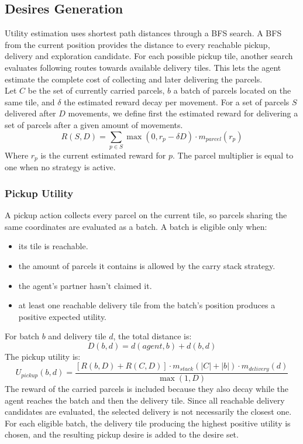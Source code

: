 \documentclass[11pt,a4paper]{article}
\begin{document}
\subsection{Desires Generation}
Utility estimation uses shortest path distances through a BFS search. 
A BFS from the current position provides the distance to every reachable pickup, delivery and exploration candidate.
For each possible pickup tile, another search evaluates following routes towards available delivery tiles. 
This lets the agent estimate the complete cost of collecting and later delivering the parcels.
\\Let $C$ be the set of currently carried parcels, $b$ a batch of parcels located on the same tile, and
$\delta$ the estimated reward decay per movement. For a set of parcels $S$ delivered after $D$ movements,
we define first the estimated reward for delivering a set of parcels after a given amount of movements.
\begin{equation*}
    R(S,D) = \sum_{p \in S} \max(0, r_p - \delta D) \cdot m_{parcel}(r_p)
\end{equation*}
Where $r_p$ is the current estimated reward for $p$. The parcel multiplier is equal to one when no strategy is active.

\subsubsection{Pickup Utility}
A pickup action collects every parcel on the current tile, so parcels sharing the same coordinates are evaluated as a batch. 
A batch is eligible only when:
\begin{itemize}
    \item its tile is reachable.
    \item the amount of parcels it contains is allowed by the carry stack strategy.
    \item the agent's partner hasn't claimed it.
    \item at least one reachable delivery tile from the batch's position produces a positive expected utility.
\end{itemize}
For batch $b$ and delivery tile $d$, the total distance is:
\begin{equation*}
    D(b,d) = d(agent,b) + d(b,d)
\end{equation*}
The pickup utility is:
\begin{equation*}
    U_{pickup}(b,d) = \frac{[R(b,D) + R(C,D)] \cdot m_{stack}(\lvert C \rvert + \lvert b \rvert) \cdot m_{delivery}(d)}{\max(1,D)}
\end{equation*}
The reward of the carried parcels is included because they also decay while the agent reaches the batch and then the delivery tile.
Since all reachable delivery candidates are evaluated, the selected delivery is not necessarily the closest one.
For each eligible batch, the delivery tile producing the highest positive utility is chosen, and the resulting pickup desire is added to the desire set.
\end{document}

